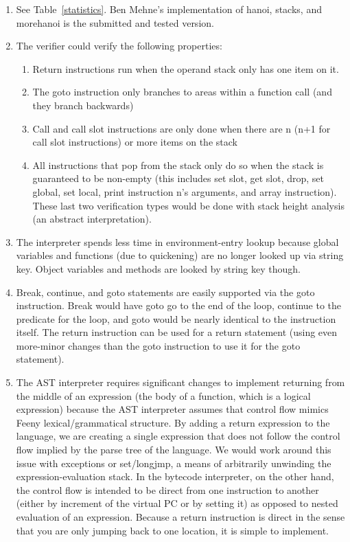 \documentclass[notitlepage]{report}
\begin{document}
\begin{enumerate}
	\item
			See Table~\ref{statistics}.  Ben Mehne's implementation of hanoi, stacks, and morehanoi is the submitted and tested version.
	\item The verifier could verify the following properties:
		\begin{enumerate}
			\item Return instructions run when the operand stack only has one item on it.
			\item The goto instruction only branches to areas within a function call (and they branch backwards)
			\item Call and call slot instructions are only done when there are n (n+1 for call slot instructions) or more items on the stack
			\item All instructions that pop from the stack only do so when the stack is guaranteed to be non-empty (this includes set slot, get slot, drop, set global, set local, print instruction n's arguments, and array instruction).  These last two verification types would be done with stack height analysis (an abstract interpretation).
		\end{enumerate}
	\item The interpreter spends less time in environment-entry lookup because global variables and functions (due to quickening) are no longer looked up via string key.  Object variables and methods are looked by string key though.
	\item Break, continue, and goto statements are easily supported via the goto instruction.  Break would have goto go to the end of the loop, continue to the predicate for the loop, and goto would be nearly identical to the instruction itself.  The return instruction can be used for a return statement (using even more-minor changes than the goto instruction to use it for the goto statement).
	\item The AST interpreter requires significant changes to implement returning from the middle of an expression (the body of a function, which is a logical expression) because the AST interpreter assumes that control flow mimics Feeny lexical/grammatical structure.  By adding a return expression to the language, we are creating a single expression that does not follow the control flow implied by the parse tree of the language.  We would work around this issue with exceptions or set/longjmp, a means of arbitrarily unwinding the expression-evaluation stack.  In the bytecode interpreter, on the other hand, the control flow is intended to be direct from one instruction to another (either by increment of the virtual PC or by setting it) as opposed to nested evaluation of an expression.  Because a return instruction is direct in the sense that you are only jumping back to one location, it is simple to implement.


\end{enumerate}
\end{document}
